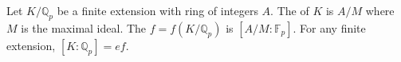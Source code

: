 Let $K/\mathbb{Q}_p$ be a finite extension with ring of integers $A$. The  of $K$ is $A/M$ where $M$ is the maximal ideal. The  $f = f(K/\mathbb{Q}_p)$ is $[A/M : \mathbb{F}_p]$. For any finite extension, $[K:\mathbb{Q}_p] = ef$.